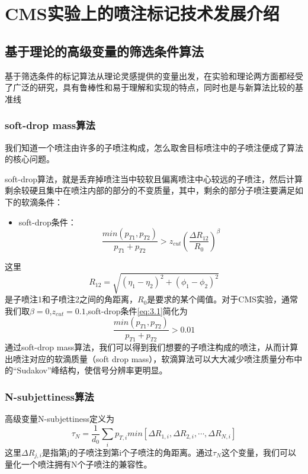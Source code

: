 \chapter{CMS实验上的喷注标记技术发展介绍}
\label{chap3}
\fontsize{12bp}{14.4pt}

\section{基于理论的高级变量的筛选条件算法}
基于筛选条件的标记算法从理论灵感提供的变量出发，在实验和理论两方面都经受了广泛的研究，具有鲁棒性和易于理解和实现的特点，同时也是与新算法比较的基准线
\subsection{soft-drop mass算法}
我们知道一个喷注由许多的子喷注构成，怎么取舍目标喷注中的子喷注便成了算法的核心问题。

soft-drop算法，就是丢弃掉喷注当中较软且偏离喷注中心较远的子喷注，然后计算剩余较硬且集中在喷注内部的部分的不变质量，其中，剩余的部分子喷注要满足如下的软滴条件：
\begin{itemize}
    \item soft-drop条件：
    \begin{equation}\label{eq:3.1}
        \frac{min(p_{T1}, p_{T2})}{p_{T1}+p_{T2}}>z_{cut} \left(\frac{\Delta R_{12}}{R_0}\right)^\beta
    \end{equation}
\end{itemize}
这里
\begin{equation}\label{eq:3.2}
    R_{12}=\sqrt{(\eta_1-\eta_2)^2+(\phi_1-\phi_2)^2}
\end{equation}
是子喷注1和子喷注2之间的角距离，$R_0$是要求的某个阈值。对于CMS实验，通常我们取$\beta=0$,$z_{cut}=0.1$,soft-drop条件\eqref{eq:3.1}简化为
\begin{equation}
    \frac{min(p_{T1}, p_{T2})}{p_{T1}+p_{T2}}>0.01
\end{equation}
通过soft-drop mass算法，我们可以得到我们想要的子喷注构成的喷注，从而计算出喷注对应的软滴质量（soft drop mass），软滴算法可以大大减少喷注质量分布中的“Sudakov”峰结构，使信号分辨率更明显。
\subsection{N-subjettiness算法}
高级变量N-subjettiness定义为
\begin{equation}
    \tau_N=\frac{1}{d_0}\sum_i p_{T,i}min\left[\Delta R_{1,i},\Delta R_{2,i},\cdots,\Delta R_{N,i}\right]
\end{equation}
这里$\Delta R_{j,i}$是指第j的子喷注到第i个子喷注的角距离。通过$\tau_N$这个变量，我们可以量化一个喷注拥有N个子喷注的兼容性。


